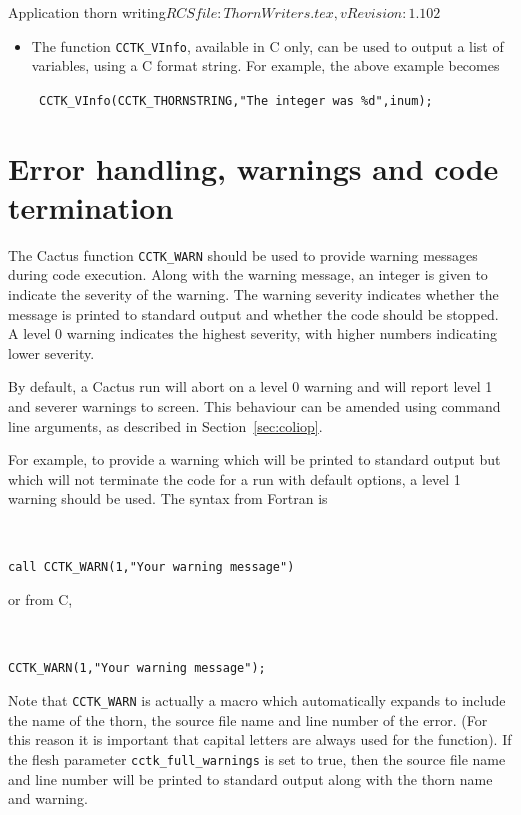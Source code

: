 \begin{cactuspart}{2}{Application thorn writing}{$RCSfile: ThornWriters.tex,v $}{$Revision: 1.102 $}
\begin{itemize}
\item{}  The function {\tt CCTK\_VInfo}, available in C only,
         can be used to output a list of variables, using a C format string.
         For example, the above example becomes

{\tt
CCTK\_VInfo(CCTK\_THORNSTRING,"The integer was \%d",inum);
}

\end{itemize}



\section{Error handling, warnings and code termination}
\label{sec:erhawancote}
The Cactus function {\tt CCTK\_WARN} should be used to provide
warning messages during code execution. Along with the
warning message, an integer is given to indicate the severity
of the warning. The warning severity indicates whether the
message is printed to standard output and whether the code
should be stopped. A level 0 warning indicates the highest
severity, with higher numbers indicating lower severity.

By default, a Cactus run will abort on a level 0 warning
and will report level 1 and severer warnings to screen.
This behaviour can be amended using command line arguments,
as described in Section~\ref{sec:coliop}.

For example, to provide a warning which will be printed to standard
output but which will not terminate the code for a run with default
options, a level 1 warning should be used. The syntax from Fortran is
{\tt
\begin{verbatim}
call CCTK_WARN(1,"Your warning message")
\end{verbatim}
}
or from C,
{\tt
\begin{verbatim}
CCTK_WARN(1,"Your warning message");
\end{verbatim}
}

Note that {\tt CCTK\_WARN} is actually a macro which automatically
expands to include the name of the thorn, the source file name and line
number of the error. (For this reason it is important that capital letters are
always used for the function). If the flesh parameter {\tt cctk\_full\_warnings} is
set to true, then the source file name and line number will be printed to
standard output along with the thorn name and warning.


\end{cactuspart}
